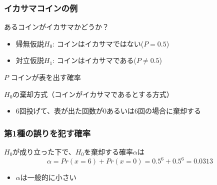 \documentclass[aspectratio=169]{beamer}
\begin{document}
    \begin{frame}
        \frametitle{イカサマコインの例}
        あるコインがイカサマかどうか？
        \begin{itemize}
            \item 帰無仮説$H_0$: コインはイカサマではない($P = 0.5$)
            \item 対立仮説$H_1$: コインはイカサマである($P \neq 0.5$)
        \end{itemize}
        $P$ コインが表を出す確率
        \vspace{1cm}
        \begin{block}{$H_0$の棄却方式（コインがイカサマであるとする方式）}
            \begin{itemize}
                \item 6回投げて、表が出た回数が0あるいは6回の場合に棄却する
            \end{itemize}
        \end{block}
    \end{frame}

    \begin{frame}
        \frametitle{第1種の誤りを犯す確率}
            $H_0$が成り立った下で、$H_0$を棄却する確率$\alpha$は
            \begin{equation}
                \alpha = Pr(x=6)+Pr(x=0) = 0.5^6 + 0.5^6 = 0.0313
            \end{equation}

            \begin{itemize}
                \item $\alpha$は一般的に小さい
            \end{itemize}
    \end{frame}
\end{document}
